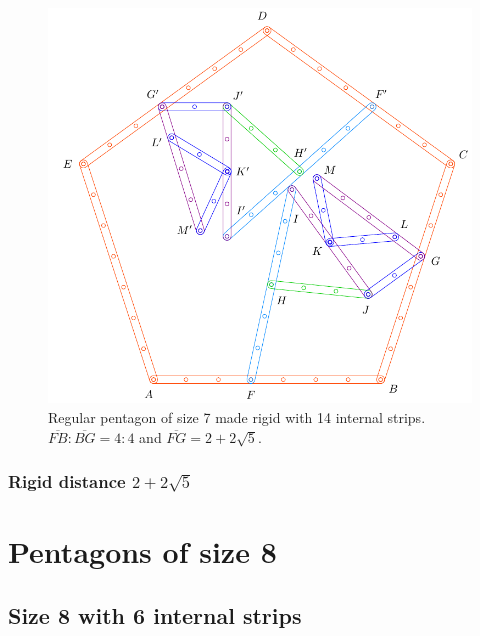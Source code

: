 \documentclass[11pt]{article}
\begin{document}
\begin{figure}[H]
\centering
\includegraphics[scale=0.8]{7/penta7-14a}
\caption{Regular pentagon of size 7 made rigid with 14 internal strips. $\overline{FB} : \overline{BG} = 4:4$ and $\overline{FG} = 2 + 2\sqrt5$.}
\label{fig:penta7-14a}
\end{figure}
%
\subsubsection{Rigid distance $2 + 2\sqrt5$}



\section{Pentagons of size 8}

\subsection{Size 8 with 6 internal strips}
\end{document}
